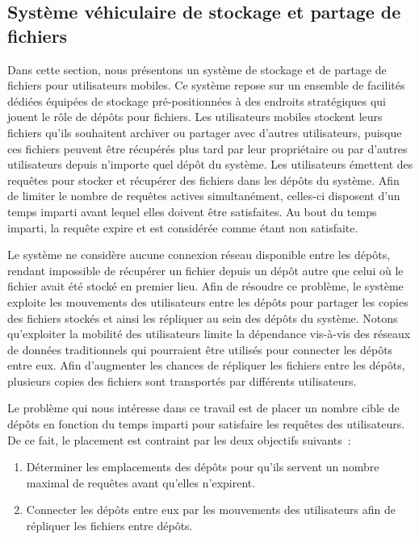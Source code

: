  
\subsection{Système véhiculaire de stockage et partage de fichiers} 
\label{sec:system-cloud-storage-fr} 
 
 
Dans cette section, nous présentons un système de stockage et de partage de fichiers pour utilisateurs mobiles. Ce système repose sur un ensemble de facilités dédiées équipées de stockage pré-positionnées à des endroits stratégiques qui jouent le rôle de dépôts pour fichiers. Les utilisateurs mobiles stockent leurs fichiers qu’ils souhaitent archiver ou partager avec d’autres utilisateurs, puisque ces fichiers peuvent être récupérés plus tard par leur propriétaire ou par d’autres utilisateurs depuis n’importe quel dépôt du système. Les utilisateurs émettent des requêtes pour stocker et récupérer des fichiers dans les dépôts du système. Afin de limiter le nombre de requêtes actives simultanément, celles-ci disposent d’un temps imparti avant lequel elles doivent être satisfaites. Au bout du temps imparti, la requête expire et est considérée comme étant non satisfaite. 
 
 
Le système ne considère aucune connexion réseau disponible entre les dépôts, rendant impossible de récupérer un fichier depuis un dépôt autre que celui où le fichier avait été stocké en premier lieu. Afin de résoudre ce problème, le système exploite les mouvements des utilisateurs entre les dépôts pour partager les copies des fichiers stockés et ainsi les répliquer au sein des dépôts du système. Notons qu’exploiter la mobilité des utilisateurs limite la dépendance vis-à-vis des réseaux de données traditionnels qui pourraient être utilisés pour connecter les dépôts entre eux. Afin d’augmenter les chances de répliquer les fichiers entre les dépôts, plusieurs copies des fichiers sont transportés par différents utilisateurs. 
 
 
Le problème qui nous intéresse dans ce travail est de placer un nombre cible de dépôts en fonction du temps imparti pour satisfaire les requêtes des utilisateurs. De ce fait, le placement est contraint par les deux objectifs suivants~: 
\begin{enumerate} 
    \item Déterminer les emplacements des dépôts pour qu’ils servent un nombre maximal de requêtes avant qu’elles n’expirent. 
 
 
    \item Connecter les dépôts entre eux par les mouvements des utilisateurs afin de répliquer les fichiers entre dépôts. 
\end{enumerate} 
 
